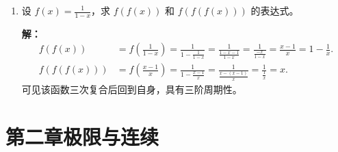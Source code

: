 \documentclass[12pt,a4paper]{ctexart}
\begin{document}
\begin{enumerate}[leftmargin=*,label=\arabic*.]
  \item 设 $f(x) = \frac{1}{1-x}$，求 $f(f(x))$ 和 $f(f(f(x)))$ 的表达式。

    \textbf{解：}
    \begin{align*}
      f(f(x)) &= f\!\left(\frac{1}{1-x}\right)
               = \frac{1}{1-\frac{1}{1-x}}
               = \frac{1}{\frac{1-x-1}{1-x}}
               = \frac{1}{\frac{-x}{1-x}}
               = \frac{x-1}{x} = 1 - \frac{1}{x}. \\[4pt]
      f(f(f(x))) &= f\!\left(\frac{x-1}{x}\right)
                  = \frac{1}{1-\frac{x-1}{x}}
                  = \frac{1}{\frac{x-(x-1)}{x}}
                  = \frac{1}{\frac{1}{x}}
                  = x.
    \end{align*}
    可见该函数三次复合后回到自身，具有三阶周期性。
\end{enumerate}

\section*{第二章\quad 极限与连续}
\end{document}
